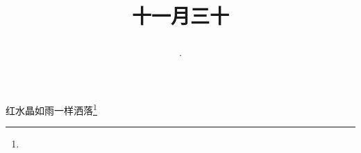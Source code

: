 \title{\date[d=30,m=12,y=2024][year:cn-y,年,month:cn,day:cn,日,·,weekday]·十一月三十 }
红水晶如雨一样洒落\footnote{ }

